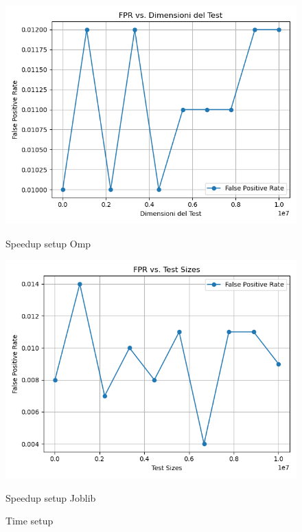 \documentclass[11pt]{article}
\begin{document}
    \begin{figure}[H]
        \centering
        \includegraphics[width=\linewidth]{omp/001/setup_fpr_plot}
            \caption{Speedup setup Omp}\label{fig:setup_fpr_omp}
        \endminipage\hfill
        \includegraphics[width=\linewidth]{joblib/001/setup_fpr_plot}
            \caption{Speedup setup Joblib}\label{fig:setup_fpr_joblib}
        \endminipage\hfill
        \caption{Time setup}
    \end{figure}
\end{document}
